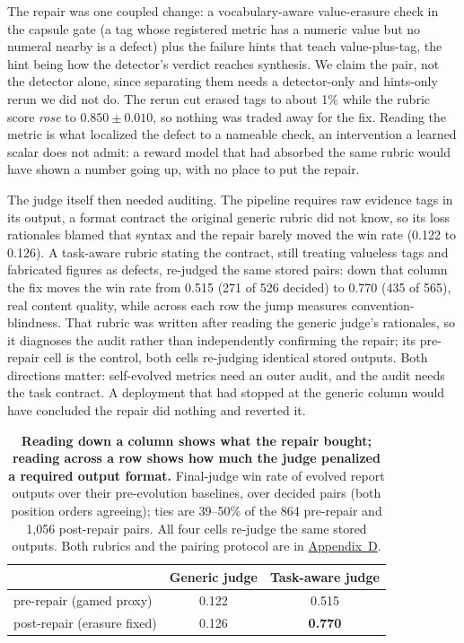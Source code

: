 \documentclass[letterpaper]{article} %
\begin{document}
The repair was one coupled change: a vocabulary-aware value-erasure check in the capsule gate (a tag whose registered metric has a numeric value but no numeral nearby is a defect) plus the failure hints that teach value-plus-tag, the hint being how the detector's verdict reaches synthesis. We claim the pair, not the detector alone, since separating them needs a detector-only and hints-only rerun we did not do. The rerun cut erased tags to about 1\% while the rubric score \emph{rose} to $0.850\pm0.010$, so nothing was traded away for the fix. Reading the metric is what localized the defect to a nameable check, an intervention a learned scalar does not admit: a reward model that had absorbed the same rubric would have shown a number going up, with no place to put the repair.

The judge itself then needed auditing. The pipeline requires raw evidence tags in its output, a format contract the original generic rubric did not know, so its loss rationales blamed that syntax and the repair barely moved the win rate (0.122 to 0.126). A task-aware rubric stating the contract, still treating valueless tags and fabricated figures as defects, re-judged the same stored pairs: down that column the fix moves the win rate from 0.515 (271 of 526 decided) to 0.770 (435 of 565), real content quality, while across each row the jump measures convention-blindness. That rubric was written after reading the generic judge's rationales, so it diagnoses the audit rather than independently confirming the repair; its pre-repair cell is the control, both cells re-judging identical stored outputs. Both directions matter: self-evolved metrics need an outer audit, and the audit needs the task contract. A deployment that had stopped at the generic column would have concluded the repair did nothing and reverted it.

\begin{table}[t]
\centering
\small
\setlength{\tabcolsep}{4.5pt}
\begin{tabular}{lcc}
\toprule
 & Generic judge & Task-aware judge \\
\midrule
pre-repair (gamed proxy) & 0.122 & 0.515 \\
post-repair (erasure fixed) & 0.126 & \textbf{0.770} \\
\bottomrule
\end{tabular}
\caption{\textbf{Reading down a column shows what the repair bought; reading across a row shows how much the judge penalized a required output format.} Final-judge win rate of evolved report outputs over their pre-evolution baselines, over decided pairs (both position orders agreeing); ties are 39--50\% of the 864 pre-repair and 1{,}056 post-repair pairs. All four cells re-judge the same stored outputs. Both rubrics and the pairing protocol are in \hyperref[app:judge]{Appendix~D}.}
\label{tab:judge}
\end{table}
\end{document}
